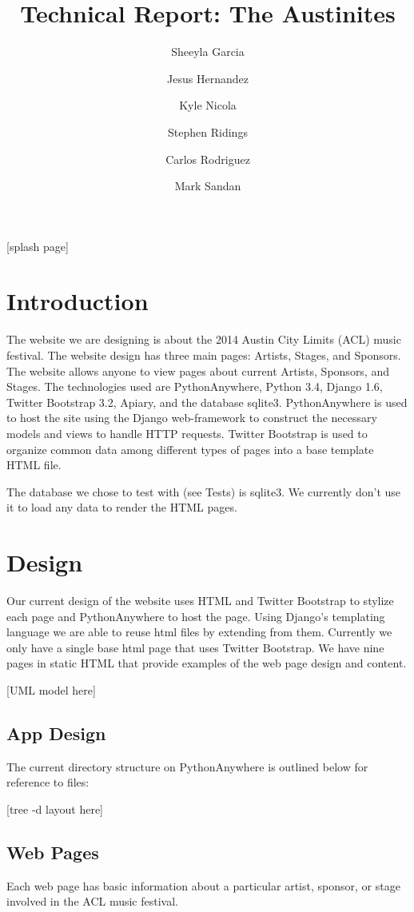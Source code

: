 \documentclass[12pt,english]{article}
\title{Technical Report: The Austinites}
\author{
  Sheeyla Garcia\\
  \and
  Jesus Hernandez\\
  \and
  Kyle Nicola\\
  \and
  Stephen Ridings\\
  \and
  Carlos Rodriguez\\
  \and
  Mark Sandan\\  
}
\date{ }
\begin{document}
\thispagestyle{plain}
\maketitle
 
 [splash page]
 
\tableofcontents

\section{Introduction} 
The website we are designing is about the 2014 Austin City Limits (ACL) music festival. The website design has three main pages: Artists, Stages, and Sponsors.
The website allows anyone to view pages about current Artists, Sponsors, and Stages. The technologies used are PythonAnywhere, Python 3.4, Django 1.6,
Twitter Bootstrap 3.2, Apiary, and the database sqlite3. PythonAnywhere is used to host the site using the Django web-framework to 
construct the necessary models and views to handle HTTP requests. Twitter Bootstrap is used to organize common data among different
types of pages into a base template HTML file. 

The database we chose to test with (see Tests) is sqlite3. We currently don't use it to load any data to render the HTML pages.

\section{Design}
Our current design of the website uses HTML and Twitter Bootstrap to stylize each page and PythonAnywhere to host the page. 
Using Django's templating language we are able to reuse html files by extending from them. Currently we only have a single base html page that
uses Twitter Bootstrap. We have nine pages in static HTML that provide examples of the web page design and content.

[UML model here]

\subsection{App Design}
The current directory structure on PythonAnywhere is outlined below for reference to files:

[tree -d layout here]

\subsection{Web Pages}
Each web page has basic information about a particular artist, sponsor, or stage involved in the ACL music festival.
\end{document}
